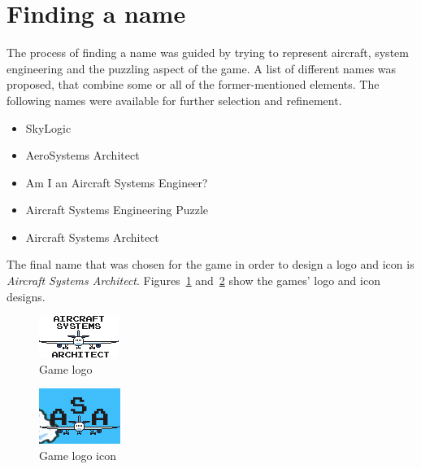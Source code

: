 \section{Finding a name}\label{sec:finding-a-name}
The process of finding a name was guided by trying to represent aircraft, system engineering and the puzzling aspect of the game.
A list of different names was proposed, that combine some or all of the former-mentioned elements.
The following names were available for further selection and refinement.
\begin{itemize}
    \item SkyLogic
    \item AeroSystems Architect
    \item Am I an Aircraft Systems Engineer?
    \item Aircraft Systems Engineering Puzzle
    \item Aircraft Systems Architect
\end{itemize}
The final name that was chosen for the game in order to design a logo and icon is \textit{Aircraft Systems Architect}.
Figures~\ref{fig:logo} and~\ref{fig:logo-icon} show the games' logo and icon designs.
\begin{figure}
    \centering
    \includegraphics[width=\textwidth]{Pictures/res/concept/aircraft-systems-architect-logo}
    \caption{Game logo}
    \label{fig:logo}
\end{figure}
\begin{figure}
    \centering
    \includegraphics[width=\textwidth]{Pictures/res/concept/asa-logo}
    \caption{Game logo icon}
    \label{fig:logo-icon}
\end{figure}

